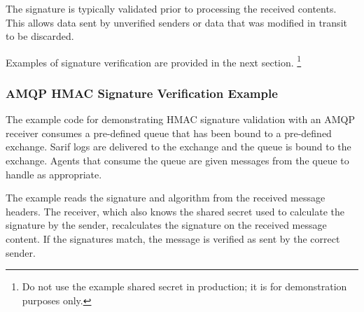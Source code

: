 The signature is typically validated prior to processing the received contents.  This
allows data sent by unverified senders or data that was modified in transit to be
discarded.

Examples of signature verification are provided in the next section.
\footnote{Do not use the example shared secret in production; it is for demonstration purposes only.}

\subsubsection{AMQP HMAC Signature Verification Example}

The example code for demonstrating HMAC signature validation with an AMQP receiver
consumes a pre-defined queue that has been bound to a pre-defined exchange. Sarif logs are
delivered to the exchange and the queue is bound to the exchange.  Agents that consume
the queue are given messages from the queue to handle as appropriate.

The example reads the signature and algorithm from the received message headers.
The receiver, which also knows the shared secret used to calculate the signature
by the sender, recalculates the signature on the received message content.  If the signatures
match, the message is verified as sent by the correct sender.






